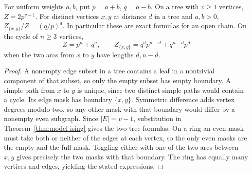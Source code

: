 \begin{corollary}\label{result75}
For uniform weights $a,b$, put $p=a+b$, $q=a-b$. On a tree with $v\ge1$ vertices, $Z=2p^{v-1}$. For distinct vertices $x,y$ at distance $d$ in a tree and $a,b>0$, $Z_{\{x,y\}}/Z=(q/p)^d$. In particular these are exact formulas for an open chain. On the cycle of $n\ge3$ vertices,
\[
 Z=p^n+q^n,\qquad
 Z_{\{x,y\}}=q^d p^{n-d}+q^{n-d}p^d
\]
when the two arcs from $x$ to $y$ have lengths $d,n-d$.
\end{corollary}
\begin{proof}
A nonempty edge subset in a tree contains a leaf in a nontrivial component of that subset, so only the empty subset has empty boundary. A simple path from $x$ to $y$ is unique, since two distinct simple paths would contain a cycle. Its edge mask has boundary $\{x,y\}$. Symmetric difference adds vertex degrees modulo two, so any other mask with that boundary would differ by a nonempty even subgraph. Since $|E|=v-1$, substitution in Theorem~\ref{thm:model-ising} gives the two tree formulas. On a ring an even mask must take both or neither of the edges at each vertex, so the only even masks are the empty and the full mask. Toggling either with one of the two arcs between $x,y$ gives precisely the two masks with that boundary. The ring has equally many vertices and edges, yielding the stated expressions.
\end{proof}

